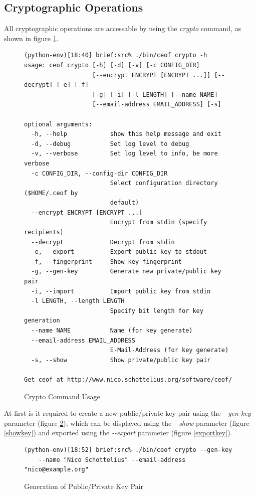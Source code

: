 \subsection{Cryptographic Operations}
All cryptographic operations are accessable by using the \textit{crypto}
command, as shown in figure \ref{cryptohelp}.
\begin{figure}
\caption{Crypto Command Usage}
\label{cryptohelp}
\begin{verbatim}
(python-env)[18:40] brief:src% ./bin/ceof crypto -h
usage: ceof crypto [-h] [-d] [-v] [-c CONFIG_DIR]
                   [--encrypt ENCRYPT [ENCRYPT ...]] [--decrypt] [-e] [-f]
                   [-g] [-i] [-l LENGTH] [--name NAME]
                   [--email-address EMAIL_ADDRESS] [-s]

optional arguments:
  -h, --help            show this help message and exit
  -d, --debug           Set log level to debug
  -v, --verbose         Set log level to info, be more verbose
  -c CONFIG_DIR, --config-dir CONFIG_DIR
                        Select configuration directory ($HOME/.ceof by
                        default)
  --encrypt ENCRYPT [ENCRYPT ...]
                        Encrypt from stdin (specify recipients)
  --decrypt             Decrypt from stdin
  -e, --export          Export public key to stdout
  -f, --fingerprint     Show key fingerprint
  -g, --gen-key         Generate new private/public key pair
  -i, --import          Import public key from stdin
  -l LENGTH, --length LENGTH
                        Specify bit length for key generation
  --name NAME           Name (for key generate)
  --email-address EMAIL_ADDRESS
                        E-Mail-Address (for key generate)
  -s, --show            Show private/public key pair

Get ceof at http://www.nico.schottelius.org/software/ceof/
\end{verbatim}
\end{figure}
At first is it required to create a new public/private key pair using
the \textit{-{}-gen-key} parameter (figure \ref{genkey}), which can
be displayed using the \textit{-{}-show} parameter (figure \ref{showkey})
and exported using the \textit{-{}-export}
parameter (figure \ref{exportkey}).
\begin{figure}
\caption{Generation of Public/Private Key Pair}
\label{genkey}
\begin{verbatim}
(python-env)[18:52] brief:src% ./bin/ceof crypto --gen-key 
    --name "Nico Schottelius" --email-address "nico@example.org"
\end{verbatim}
\end{figure}
